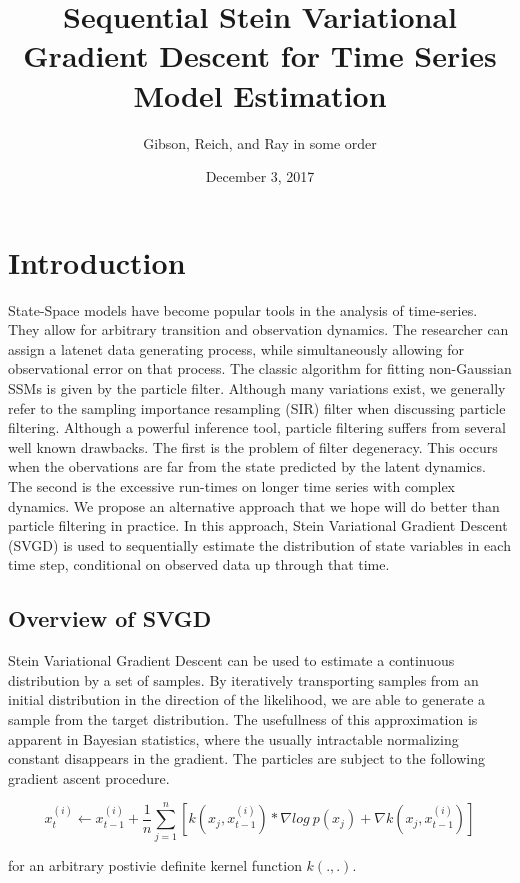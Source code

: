 \documentclass[]{article}
\title{Sequential Stein Variational Gradient Descent for Time Series Model
Estimation}
\author{Gibson, Reich, and Ray in some order}
\date{December 3, 2017}
\begin{document}
\maketitle

\section{Introduction}\label{introduction}

State-Space models have become popular tools in the analysis of
time-series. They allow for arbitrary transition and observation
dynamics. The researcher can assign a latenet data generating process,
while simultaneously allowing for observational error on that process.
The classic algorithm for fitting non-Gaussian SSMs is given by the
particle filter. Although many variations exist, we generally refer to
the sampling importance resampling (SIR) filter when discussing particle
filtering. Although a powerful inference tool, particle filtering
suffers from several well known drawbacks. The first is the problem of
filter degeneracy. This occurs when the obervations are far from the
state predicted by the latent dynamics. The second is the excessive
run-times on longer time series with complex dynamics. We propose an
alternative approach that we hope will do better than particle filtering
in practice. In this approach, Stein Variational Gradient Descent (SVGD)
is used to sequentially estimate the distribution of state variables in
each time step, conditional on observed data up through that time.

\subsection{Overview of SVGD}\label{overview-of-svgd}

Stein Variational Gradient Descent can be used to estimate a continuous
distribution by a set of samples. By iteratively transporting samples
from an initial distribution in the direction of the likelihood, we are
able to generate a sample from the target distribution. The usefullness
of this approximation is apparent in Bayesian statistics, where the
usually intractable normalizing constant disappears in the gradient. The
particles are subject to the following gradient ascent procedure.

\[x_t^{(i)} \leftarrow x_{t-1}^{(i)} + \frac{1}{n}\sum_{j=1}^n[ k(x_j,x_{t-1}^{(i)})*\nabla log\ p(x_j) + \nabla k(x_j,x_{t-1}^{(i)})]\]

for an arbitrary postivie definite kernel function \(k(.,.)\).
\end{document}
